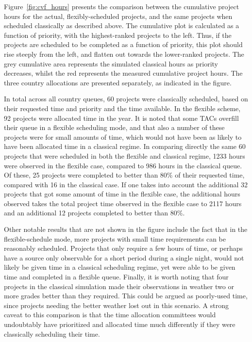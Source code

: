 \documentclass[]{spie}  %
\begin{document}
Figure~\ref{fig:cvf_hours} presents the comparison between the
cumulative project hours for the actual, flexibly-scheduled projects,
and the same projects when scheduled classically as described
above. The cumulative plot is calculated as a function of priority,
with the highest-ranked projects to the left. Thus, if the projects
are scheduled to be completed as a function of priority, this plot
should rise steeply from the left, and flatten out towards the
lower-ranked projects. The grey cumulative area represents the
simulated classical hours as priority decreases, whilst the red
represents the measured cumulative project hours. The three country
allocations are presented separately, as indicated in the figure.

In total across all country queues, 60 projects were classically
scheduled, based on their requested time and priority and the time
available. In the flexible scheme, 92 projects were allocated time in
the year. It is noted that some TACs overfill their queue in a
flexible scheduling mode, and that also a number of these projects
were for small amounts of time, which would not have been as likely to
have been allocated time in a classical regime. In comparing directly
the same 60 projects that were scheduled in both the flexible and
classical regime, 1233 hours were observed in the flexible case,
compared to 986 hours in the classical queue. Of these, 25 projects
were completed to better than 80$\%$ of their requested time, compared
with 16 in the classical case. If one takes into account the
additional 32 projects that got some amount of time in the flexible
case, the additional hours observed takes the total project time
observed in the flexible case to 2117 hours and an additional 12
projects completed to better than 80$\%$.

Other notable results that are not shown in the figure include the
fact that in the flexible-schedule mode, more projects with small time
requirements can be reasonably scheduled. Projects that only require a
few hours of time, or perhaps have a source only observable for a
short period during a single night, would not likely be given time in
a classical scheduling regime, yet were able to be given time and
completed in a flexible queue. Finally, it is worth noting that four
projects in the classical simulation made their observations in
weather two or more grades better than they required. This could be
argued as poorly-used time, since projects needing the better weather
lost out in this scenario. A strong caveat to this comparison is that
the time allocation committees would undoubtably have prioritized and
allocated time much differently if they were classically scheduling
their time.
\end{document}
